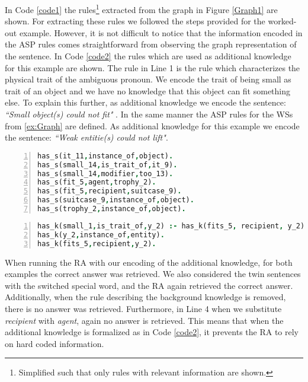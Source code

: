 In Code \ref{code1} the rules\footnote{Simplified such that only rules with relevant information are shown.} extracted from the graph in Figure \ref{Graph1} are shown. For extracting these rules we followed the steps provided for the worked-out example. However, it is not difficult to notice that the information encoded in the ASP rules comes straightforward from observing the graph representation of the sentence.
In Code \ref{code2} the rules which are used as additional knowledge for this example are shown. The rule in Line 1 is the rule which characterizes the physical trait of the ambiguous pronoun. We encode the trait of being small as trait of an object and we have no knowledge that this object can fit something else. To explain this further, as additional knowledge we encode the sentence: \textit{``Small object(s) could not fit" }.
In the same manner the ASP rules for the WSs from \ref{ex:Graph} are defined. As additional knowledge for this example we encode the sentence: \textit{``Weak entitie(s) could not lift"}.

\begin{lstlisting}[language = Prolog,  caption={Knowledge from S2},label=code1, numbers=left,
numberstyle=\tiny] 
has_s(it_11,instance_of,object).
has_s(small_14,is_trait_of,it_9).
has_s(small_14,modifier,too_13).
has_s(fit_5,agent,trophy_2).
has_s(fit_5,recipient,suitcase_9).
has_s(suitcase_9,instance_of,object).
has_s(trophy_2,instance_of,object).
\end{lstlisting}

\begin{lstlisting}[language = Prolog,  caption={Additional knowledge},label=code2,numbers=left,
numberstyle=\tiny]
has_k(small_1,is_trait_of,y_2) :- has_k(fits_5, recipient, y_2), not has_k(fits_5,modifier,could_3).
has_k(y_2,instance_of,entity).
has_k(fits_5,recipient,y_2).
\end{lstlisting}

When running the RA with our encoding of the additional knowledge, for both examples the correct answer was retrieved. We also considered the twin sentences with the switched special word, and the RA again retrieved the correct answer. Additionally, when the rule describing the background knowledge is removed, there is no answer was retrieved. Furthermore, in Line 4 when we substitute \textit{recipient} with \textit{agent}, again no answer is retrieved. This means that when the additional knowledge is formalized as in Code \ref{code2}, it prevents the RA to rely on hard coded information.









